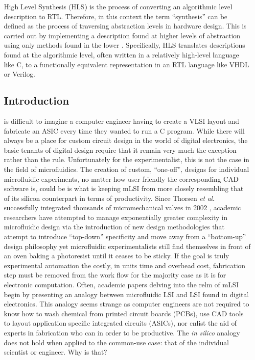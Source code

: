 \documentclass[11pt,journal,compsoc, onecolumn]{IEEEtran}
\begin{document}
High Level Synthesis (HLS) is the process of converting an algorithmic level description to RTL. Therefore, in this context the term  ``synthesis'' can be defined as the process of traversing abstraction levels in hardware design. This is carried out by implementing a description found at higher levels of abstraction using only methods found in the lower \cite{churtl}. Specifically, HLS translates descriptions found at the algorithmic level, often written in a relatively high-level language like C, to a functionally equivalent representation in an RTL language like VHDL or Verilog.


\cite{1}\cite{3}\cite{4}\cite{5}\cite{6}\cite{7}\cite{8}\cite{9}\cite{10}\cite{11}\cite{12}\cite{13}\cite{14}\cite{15}\cite{16}\cite{17}\cite{18}\cite{19}\cite{20}
\subsection{Introduction}
 is
difficult to imagine a computer engineer having to create a VLSI layout and
fabricate an ASIC every time they wanted to run a C program. While there will
always be a place for custom circuit design in the world of digital
electronics, the basic tenants of digital design require that it remain
very much the exception rather than the rule. Unfortunately for the
experimentalist, this is not the case in the field of microfluidics. 
The creation of custom, ``one-off'', designs
for individual microfluidic experiments, no matter how user-friendly the
corresponding CAD software is, could be is what is keeping mLSI from
more closely resembling that of its silicon counterpart in terms of
productivity. Since Thorsen \emph{et al.} successfully integrated thousands of
micromechanical valves in 2002 \cite{thorsen2002}, academic researchers have
attempted to manage exponentially greater complexity in microfluidic design via
the introduction of new design methodologies that attempt to introduce
``top-down'' specificity and move away from a ``bottom-up'' design philosophy
 \cite{minhass2013}\cite{melin2007}\cite{minhass2012} yet microfluidic
 experimentalists still find themselves in front of an oven baking a photoresist
until it ceases to be sticky. If the goal is truly experimental automation the
costly, in units time and overhead cost, fabrication step must be removed from the
work flow for the majority case as it is for electronic computation. 
Often, academic papers delving into the relm of mLSI begin by presenting an analogy
between microfluidic LSI and LSI found in digital electronics. This analogy seems
strange as computer engineers are not required to know how to wash chemical
from printed circuit boards (PCBs), use CAD tools to layout application
specific integrated circuits (ASICs), nor enlist the aid of experts in
fabrication who can in order to be productive.  The \emph{in
silico} analogy does not hold when applied to the common-use case: that of the
individual scientist or
engineer. Why is that? 
\end{document}

